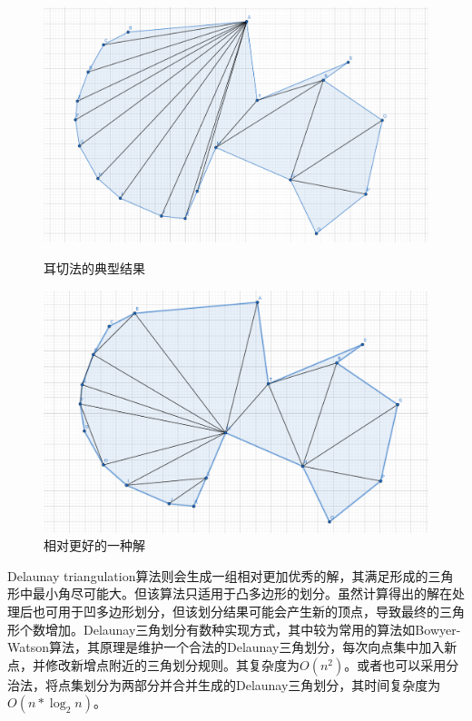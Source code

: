 \begin{figure}[htbp]
  \centering
  \begin{minipage}{0.4\textwidth}
      \centering
      \includegraphics[width=\textwidth]
      {figures/ear clipping.png}
      \caption{耳切法的典型结果}
  \end{minipage}
  \begin{minipage}{0.4\textwidth}
      \centering
      \includegraphics[width=\textwidth]
      {figures/better.png}
      \caption{相对更好的一种解}
  \end{minipage}
\end{figure}

Delaunay triangulation算法则会生成一组相对更加优秀的解，其满足形成的三角形中最小角尽可能大。但该算法只适用于凸多边形的划分。虽然计算得出的解在处理后也可用于凹多边形划分，但该划分结果可能会产生新的顶点，导致最终的三角形个数增加。Delaunay三角划分有数种实现方式，其中较为常用的算法如Bowyer-Watson算法，其原理是维护一个合法的Delaunay三角划分，每次向点集中加入新点，并修改新增点附近的三角划分规则。其复杂度为\(O(n^2)\)。或者也可以采用分治法，将点集划分为两部分并合并生成的Delaunay三角划分，其时间复杂度为\(O(n*\log_2n)\)。

